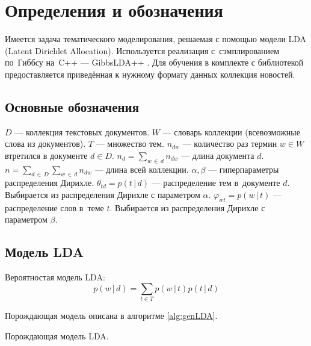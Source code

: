 \documentclass[12pt]{article}
\begin{document}
\section{Определения и обозначения}
Имеется задача тематического моделирования, решаемая с помощью модели LDA (Latent Dirichlet Allocation). 
Используется реализация с~сэмплированием по~Гиббсу на~C++ --- GibbsLDA++ \cite{gibbslda++}. 
Для обучения в комплекте с библиотекой предоставляется приведённая к нужному формату данных коллекция новостей.

\subsection{Основные обозначения}
$ D $ --- коллекция текстовых документов. \newline
$ W $ --- словарь коллекции (всевозможные слова из документов).\newline
$ T $ --- множество тем.\newline
$ n_{dw} $ --- количество раз термин $ w \in W $ втретился в документе $ d \in D $.\newline
$\displaystyle n_d = \sum_{w\,\in\,d}n_{dw} $ --- длина документа $ d $.\newline
$\displaystyle n = \sum_{d\,\in\,D}\sum_{w\,\in\,d}n_{dw} $ --- длина всей коллекции.\newline
$ \alpha, \beta $ --- гиперпараметры распределения Дирихле.\newline
$\displaystyle \theta_{td} = p(t\,|\,d) $ --- распределение тем в~документе $ d $. Выбирается из распределения Дирихле с параметром $ \alpha $.\newline
$\displaystyle \varphi_{wt} = p(w\,|\,t) $ --- распределение слов в~теме $ t $. Выбирается из распределения Дирихле с параметром $ \beta $.

\subsection{Модель LDA}
Вероятностая модель LDA:
\[
  p(w\,|\,d) = \sum_{t \in T}p(w\,|\,t)p(t\,|\,d)
\]

Порождающая модель описана в алгоритме \ref{alg:genLDA}.

\begin{algorithm}
\label{alg:genLDA}
\caption{Порождающая модель LDA.}
\DontPrintSemicolon


\end{algorithm}
\end{document}
